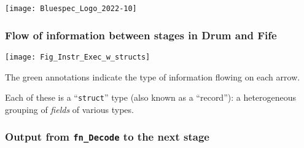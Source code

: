 



\date{L5: {\BSV} Structs; Memory requests and responses}


\renewcommand{\PAUSE}[1]{#1}





\begin{frame}
 \titlepage

 \begin{center}
  \texttt{[image: Bluespec\_Logo\_2022-10]}
 \end{center}

\end{frame}


\begin{frame}
\frametitle{Flow of information between stages in Drum and Fife}

\footnotesize

\begin{center}
\texttt{[image: Fig\_Instr\_Exec\_w\_structs]}
\end{center}

\vspace*{2ex}

The green annotations indicate the type of information flowing on each arrow.

Each of these is a ``{\tt struct}'' type (also known as a ``record''):
a heterogeneous grouping of \emph{fields} of various types.

\end{frame}


\begin{frame}
\frametitle{Output from {\tt fn\_Decode} to the next stage}

\footnotesize



\end{frame}

